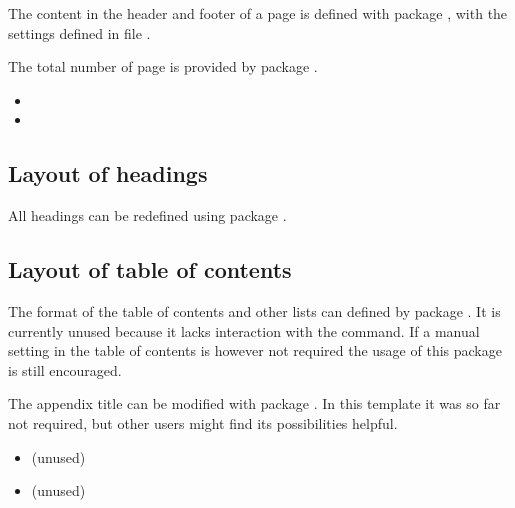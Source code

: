 The content in the header and footer of a page is defined with package 
, with the settings defined in file 
.

The total number of page is provided by package .

\begin{itemize}[noitemsep]
\item {}
\item {}
\end{itemize}


\subsection{Layout of headings}
\label{sec:packages:headings}

All headings can be redefined using package .


\subsection{Layout of table of contents}
\label{sec:packages:TOC}

The format of the table of contents and other lists can defined by package . It is currently unused because it lacks interaction with the  command. If a manual setting in the table of contents is however not required the usage of this package is still encouraged.

The appendix title can be modified with package . In this template it was so far not required, but other users might find its possibilities helpful.

\begin{itemize}[noitemsep]
\item {} (unused)
\item {} (unused)
\end{itemize}


